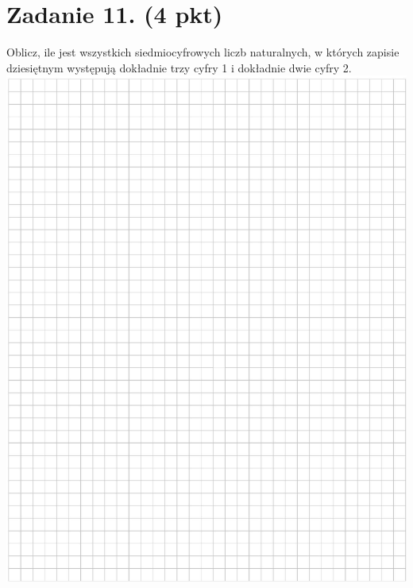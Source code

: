 \documentclass[10pt]{article}
\begin{document}
\section*{Zadanie 11. (4 pkt)}
Oblicz, ile jest wszystkich siedmiocyfrowych liczb naturalnych, w których zapisie dziesiętnym występują dokładnie trzy cyfry 1 i dokładnie dwie cyfry 2.\\
\includegraphics[max width=\textwidth, center]{2024_11_21_ebf83f11df6f4915f701g-18}\\
\end{document}
